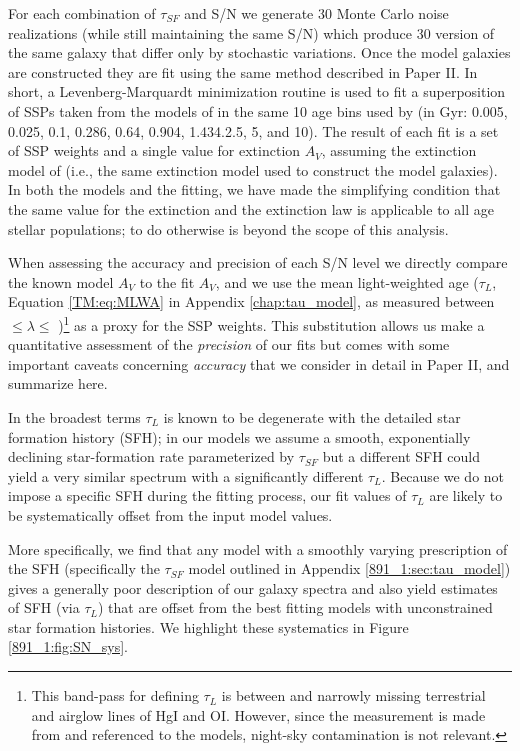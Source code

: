 
For each combination of $\tau_{SF}$ and S/N we generate 30 Monte Carlo
noise realizations (while still maintaining the same S/N) which
produce 30 version of the same galaxy that differ only by stochastic
variations. Once the model galaxies are constructed they are fit using
the same method described in Paper II. In short, a Levenberg-Marquardt
minimization routine is used to fit a superposition of SSPs taken from
the models of \citet{Bruzual03} in the same 10 age bins used by
\citet{Tremonti04} (in Gyr: 0.005, 0.025, 0.1, 0.286, 0.64, 0.904,
1.434.2.5, 5, and 10). The result of each fit is a set of SSP weights
and a single value for extinction $A_V$, assuming the extinction model
of \citet{Charlot00} (i.e., the same extinction model used to
construct the model galaxies). In both the models and the fitting, we
have made the simplifying condition that the same value for the
extinction and the extinction law is applicable to all age stellar
populations; to do otherwise is beyond the scope of this analysis.

When assessing the accuracy and precision of each S/N level we
directly compare the known model $A_V$ to the fit $A_V$, and we use
the mean light-weighted age ($\tau_L$, Equation \ref{TM:eq:MLWA} in
Appendix \ref{chap:tau_model}, as measured between 
$\leq\lambda\leq$ )\footnote{ This band-pass for
  defining $\tau_L$ is between and narrowly missing terrestrial and
  airglow lines of HgI and OI. However, since the measurement is made
  from and referenced to the models, night-sky contamination is not
  relevant.}  as a proxy for the SSP weights. This substitution allows
us make a quantitative assessment of the {\it precision} of our fits
but comes with some important caveats concerning {\it accuracy} that
we consider in detail in Paper II, and summarize here.

In the broadest terms $\tau_L$ is known to be degenerate with the
detailed star formation history (SFH); in our models we assume a
smooth, exponentially declining star-formation rate parameterized by
$\tau_{SF}$ but a different SFH could yield a very similar spectrum
with a significantly different $\tau_L$.  Because we do not impose a
specific SFH during the fitting process, our fit values of $\tau_L$
are likely to be systematically offset from the input model values.

More specifically, we find that any model with a smoothly varying
prescription of the SFH (specifically the $\tau_{SF}$ model outlined
in Appendix \ref{891_1:sec:tau_model}) gives a generally poor description of
our galaxy spectra and also yield estimates of SFH (via $\tau_L$) that
are offset from the best fitting models with unconstrained star
formation histories. We highlight these systematics in Figure
\ref{891_1:fig:SN_sys}.

